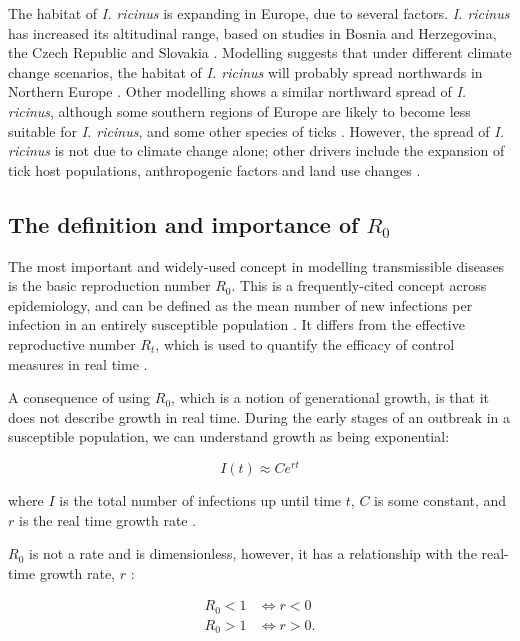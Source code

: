 \documentclass[hidelinks]{article}
\begin{document}
The habitat of \textit{I. ricinus} is expanding in Europe, due to several factors. \textit{I. ricinus} has increased its altitudinal range, based on studies in Bosnia and Herzegovina, the Czech Republic and Slovakia \citep{Medlock2013}. Modelling suggests that under different climate change scenarios, the habitat of \textit{I. ricinus} will probably spread northwards in Northern Europe \citep{Alkishe_2017}. Other modelling shows a similar northward spread of \textit{I. ricinus}, although some southern regions of Europe are likely to become less suitable for \textit{I. ricinus}, and some other species of ticks \citep{Cunze_2022}. However, the spread of \textit{I. ricinus} is not due to climate change alone; other drivers include the expansion of tick host populations, anthropogenic factors and land use changes \citep{Medlock2013}.

\subsection{The definition and importance of \texorpdfstring{$ R_0 $}{R0}}

The most important and widely-used concept in modelling transmissible diseases is the basic reproduction number $ R_0 $. This is a frequently-cited concept across epidemiology, and can be defined as the mean number of new infections per infection in an entirely susceptible population \citep{Diekman2000}. It differs from the effective reproductive number $ R_t $, which is used to quantify the efficacy of control measures in real time \citep{Lim2020}.

A consequence of using $ R_0 $, which is a notion of generational growth, is that it does not describe growth in real time. During the early stages of an outbreak in a susceptible population, we can understand growth as being exponential:

\begin{equation}
	I(t) \approx Ce^{rt} \nonumber
\end{equation}

where $ I $ is the total number of infections up until time $ t $, $ C $ is some constant, and $ r $ is the real time growth rate \citep{Diekman2000}.

$ R_0 $ is not a rate and is dimensionless, however, it has a relationship with the real-time growth rate, $ r $ \citep{Diekman2000}:

\begin{align}\label{R0}
  R_0 < 1 &\iff r < 0 \nonumber \\
  R_0 > 1 &\iff r > 0.
\end{align}
\end{document}
